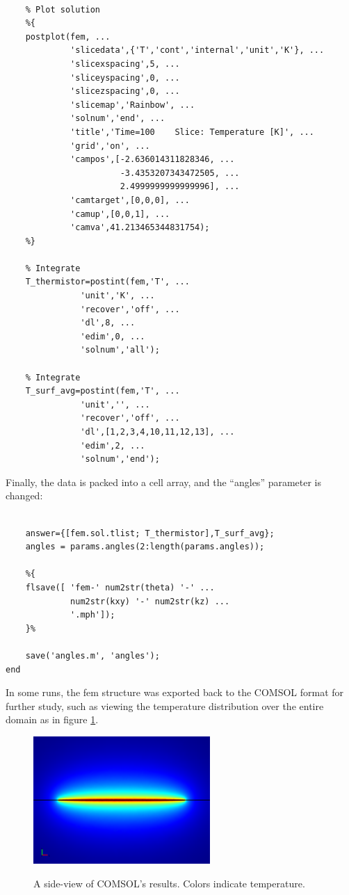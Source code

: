 \small
\begin{verbatim}

    % Plot solution
    %{
    postplot(fem, ...
             'slicedata',{'T','cont','internal','unit','K'}, ...
             'slicexspacing',5, ...
             'sliceyspacing',0, ...
             'slicezspacing',0, ...
             'slicemap','Rainbow', ...
             'solnum','end', ...
             'title','Time=100    Slice: Temperature [K]', ...
             'grid','on', ...
             'campos',[-2.636014311828346, ...
                       -3.4353207343472505, ...
                       2.4999999999999996], ...
             'camtarget',[0,0,0], ...
             'camup',[0,0,1], ...
             'camva',41.213465344831754);
    %}

    % Integrate
    T_thermistor=postint(fem,'T', ...
               'unit','K', ...
               'recover','off', ...
               'dl',8, ...
               'edim',0, ...
               'solnum','all');

    % Integrate
    T_surf_avg=postint(fem,'T', ...
               'unit','', ...
               'recover','off', ...
               'dl',[1,2,3,4,10,11,12,13], ...
               'edim',2, ...
               'solnum','end');
\end{verbatim}
\normalsize

Finally, the data is packed into a cell array, and the ``angles'' parameter
is changed:

\small
\begin{verbatim}

    answer={[fem.sol.tlist; T_thermistor],T_surf_avg};
    angles = params.angles(2:length(params.angles));

    %{
    flsave([ 'fem-' num2str(theta) '-' ...
             num2str(kxy) '-' num2str(kz) ...
             '.mph']);
    }%

    save('angles.m', 'angles');
end
\end{verbatim}
\normalsize

In some runs, the fem structure was exported back to the COMSOL format for
further study, such as viewing the temperature distribution over the entire
domain as in figure \ref{fig:comsol}.

\begin{figure}[h]
\centering
\includegraphics[width=0.6\textwidth]{fig/35892_elem_1097s.png}
\label{fig:comsol}
\caption{A side-view of COMSOL's results. Colors indicate temperature.}
\end{figure}

